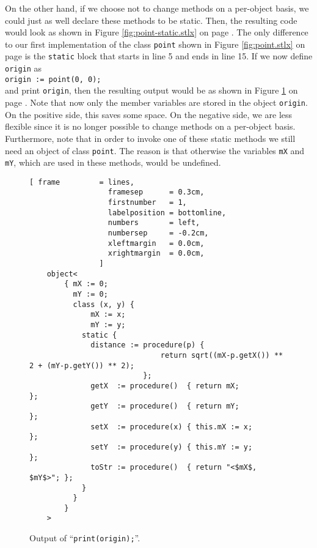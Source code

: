 On the other hand, if we choose not to change methods on a per-object basis, we could just as well
declare these methods to be static.  Then, the resulting code would look as shown in Figure
\ref{fig:point-static.stlx} on page \pageref{fig:point-static.stlx}.  The only difference to our
first implementation of the class \texttt{point} shown in Figure \ref{fig:point.stlx} on page
\pageref{fig:point.stlx} is the \texttt{static} block that starts in line 5 and ends in line 15.
If we now define \texttt{origin} as
\\[0.2cm]
\hspace*{1.3cm}
\texttt{origin := point(0, 0);}
\\[0.2cm]
and print \texttt{origin}, then the resulting output would be as shown in Figure
\ref{fig:point-static.stlx-origin} on page \pageref{fig:point-static.stlx-origin}.
Note that now only the member variables are stored in the object \texttt{origin}.  On the positive
side, this saves some space.  On the negative side, we are less flexible since it is no longer
possible to change methods on a per-object basis.  Furthermore, note that in order to invoke one of these
static methods we still need an object of class \texttt{point}.  The reason is that otherwise the
variables \texttt{mX} and \texttt{mY}, which are used in these methods, would be undefined.

\begin{figure}[!ht]
\centering
\begin{Verbatim}[ frame         = lines, 
                  framesep      = 0.3cm, 
                  firstnumber   = 1,
                  labelposition = bottomline,
                  numbers       = left,
                  numbersep     = -0.2cm,
                  xleftmargin   = 0.0cm,
                  xrightmargin  = 0.0cm,
                ]
    object<
        { mX := 0; 
          mY := 0; 
          class (x, y) { 
              mX := x; 
              mY := y; 
            static { 
              distance := procedure(p) { 
                              return sqrt((mX-p.getX()) ** 2 + (mY-p.getY()) ** 2); 
                          }; 
              getX  := procedure()  { return mX;             }; 
              getY  := procedure()  { return mY;             }; 
              setX  := procedure(x) { this.mX := x;          }; 
              setY  := procedure(y) { this.mY := y;          }; 
              toStr := procedure()  { return "<$mX$, $mY$>"; }; 
            } 
          } 
        }
    >
\end{Verbatim}
\vspace*{-0.3cm}
\caption{Output of ``\texttt{print(origin);}''.}
\label{fig:point-static.stlx-origin}
\end{figure}


